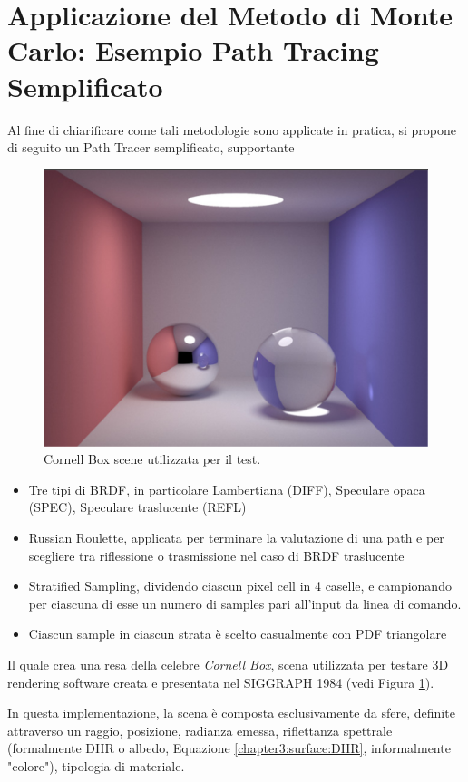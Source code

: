 \section{Applicazione del Metodo di Monte Carlo: Esempio Path Tracing Semplificato}
Al fine di chiarificare come tali metodologie sono applicate in pratica, si propone di seguito un Path Tracer semplificato, supportante
\begin{figure}[tb]
	\centering
	\includegraphics[width=0.7\linewidth]{../assets/chapter8_MCRendering_reference.png}
	\caption{Cornell Box scene utilizzata per il test.}
	\label{chapter8:MCRendering:reference}
\end{figure}
\begin{itemize}[topsep=0pt,noitemsep]
	\item Tre tipi di BRDF, in particolare Lambertiana (\textrm{DIFF}), Speculare opaca (\textrm{SPEC}), Speculare traslucente (\textrm{REFL}) 
	\item Russian Roulette, applicata per terminare la valutazione di una path e per scegliere tra riflessione o trasmissione nel caso di 
		BRDF traslucente
	\item Stratified Sampling, dividendo ciascun pixel cell in 4 caselle, e campionando per ciascuna di esse un numero di samples pari all'input da 
		linea di comando. 
	\item Ciascun sample in ciascun strata \`e scelto casualmente con PDF triangolare
\end{itemize}
Il quale crea una resa della celebre \textit{Cornell Box}, scena utilizzata per testare 3D rendering software creata e presentata nel SIGGRAPH 1984
(vedi Figura \ref{chapter8:MCRendering:reference}).\par
In questa implementazione, la scena \`e composta esclusivamente da sfere, definite attraverso un raggio, posizione, radianza emessa, 
riflettanza spettrale (formalmente DHR o albedo, Equazione \ref{chapter3:surface:DHR}, informalmente "colore"), tipologia di materiale.
